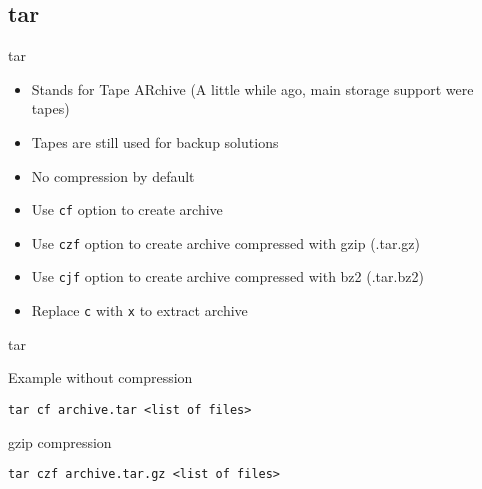 \subsection{tar}

\begin{frame}[fragile]{tar}
  \begin{itemize}
    \pause \item Stands for Tape ARchive (A little while ago, main storage support were tapes)
    \pause \item Tapes are still used for backup solutions
    \pause \item No compression by default
    \pause \item Use \texttt{cf} option to create archive
    \pause \item Use \texttt{czf} option to create archive compressed with gzip (.tar.gz)
    \pause \item Use \texttt{cjf} option to create archive compressed with bz2 (.tar.bz2)
    \pause \item Replace \texttt{c} with \texttt{x} to extract archive
  \end{itemize}
\end{frame}

\begin{frame}[fragile]{tar}
  \begin{exampleblock}{Example without compression}
    \begin{lstlisting}[showstringspaces=false]
tar cf archive.tar <list of files>
    \end{lstlisting}
  \end{exampleblock}
  \pause

  \begin{exampleblock}{gzip compression}
    \begin{lstlisting}[showstringspaces=false]
tar czf archive.tar.gz <list of files>
    \end{lstlisting}
  \end{exampleblock}
\end{frame}

